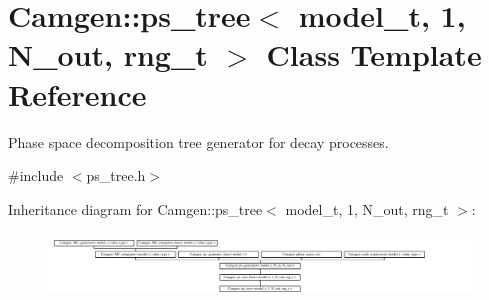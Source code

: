 \hypertarget{a00456}{}\section{Camgen\+:\+:ps\+\_\+tree$<$ model\+\_\+t, 1, N\+\_\+out, rng\+\_\+t $>$ Class Template Reference}
\label{a00456}


Phase space decomposition tree generator for decay processes.  




{\ttfamily \#include $<$ps\+\_\+tree.\+h$>$}

Inheritance diagram for Camgen\+:\+:ps\+\_\+tree$<$ model\+\_\+t, 1, N\+\_\+out, rng\+\_\+t $>$\+:\begin{figure}[H]
\begin{center}
\leavevmode
\includegraphics[height=1.739130cm]{a00456}
\end{center}
\end{figure}
